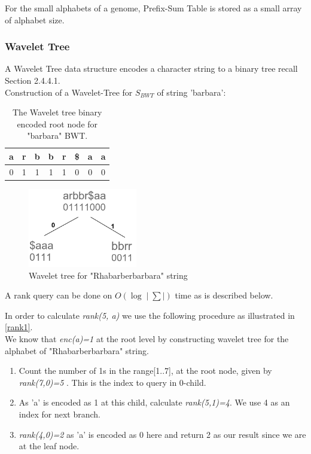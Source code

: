 \documentclass[11pt,a4paper]{report}
\begin{document}
For the small alphabets of a genome, Prefix-Sum Table is stored
as a small array of alphabet size.

\subsubsection{Wavelet Tree}  \label{Wavelet Tree}
A Wavelet Tree data structure encodes a character string to a
binary tree recall Section 2.4.4.1.\\

Construction of a Wavelet-Tree for $ S_{BWT} $ of string 'barbara':

\begin{table}[h]
\centering
  \begin{tabular}{ c c c c c c c c}
   a  & r & b & b & r & \$ & a & a \\ 
  \hline
   0 &	1 &	1 & 1 & 1 & 0 & 0 & 0\\  
  \hline
  \end{tabular}
\caption{The Wavelet tree binary encoded root node for "barbara" BWT.}
\label{wavlet-binary-barbara}
\end{table}


\begin{figure}[H]
\centering
\includegraphics[width=4.75cm]{pictures/WavletBarbara.png}
\caption{Wavelet tree for "Rhabarberbarbara" string }
\label{Wavlet-barbara}
\end{figure}


A rank query can be done on  $O(\log{}\mid\sum\mid)$ time as is described below.

In order to calculate \emph{rank(5, a)} we use the following procedure
as illustrated in \ref{rank1}.\\
We know that \emph{enc(a)=1} at the root level by constructing wavelet
tree for the alphabet of  "Rhabarberbarbara" string.

\begin{enumerate}

    \item
		 Count the number of 1s in the range[1..7], at the root node, 
		 given by \emph{rank(7,0)=5 }. This is the index to query in 0-child.
		 
    \item
		As 'a' is encoded as 1 at this child, calculate \emph{rank(5,1)=4}. 
		We use 4 as an index for next branch.

    \item
		\emph{rank(4,0)=2} as 'a' is encoded as 0 here and return 2 as our
		 result since we are at the leaf node.

\end{enumerate}
\end{document}
